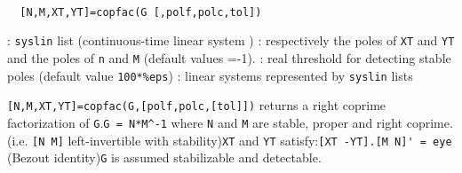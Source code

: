 \begin{mandesc}
   \\ %
\end{mandesc}
\begin{calling_sequence}
\begin{verbatim}
  [N,M,XT,YT]=copfac(G [,polf,polc,tol])   
\end{verbatim}
\end{calling_sequence}
\begin{parameters}
  \begin{varlist}
    : \verb!syslin! list  (continuous-time linear system )
    : respectively the poles of \verb!XT! and \verb!YT! and the poles of \verb!n!  and \verb!M! (default values =-1).
    : real threshold for detecting stable poles (default value \verb!100*%eps!)
    : linear systems represented by \verb!syslin! lists
  \end{varlist}
\end{parameters}
\begin{mandescription}
  \verb![N,M,XT,YT]=copfac(G,[polf,polc,[tol]])! returns a right coprime
  factorization of \verb!G!.\verb!G = N*M^-1! where \verb!N! and \verb!M! are
  stable, proper and right coprime.  (i.e. \verb![N M]! left-invertible with
  stability)\verb!XT! and \verb!YT! satisfy:\verb![XT -YT].[M N]' = eye! (Bezout
  identity)\verb!G! is assumed stabilizable and detectable.
\end{mandescription}
\begin{manseealso}
     
\end{manseealso}

